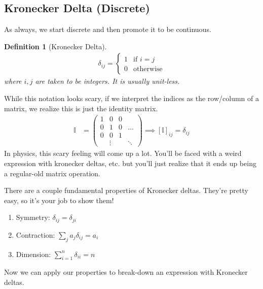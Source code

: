 \documentclass[12pt,fleqn]{article}
\numberwithin{equation}{section} %
\newtheorem{definition}{Definition}
\newcounter{problem}
\begin{document}
\subsection{Kronecker Delta (Discrete)}
As always, we start discrete and then promote it to be continuous.
\begin{definition}
	[Kronecker Delta]
	\begin{align}
		\delta_{ij} = \begin{cases}
			1 & \text{if } i = j\\
			0 & \text{otherwise}
		\end{cases}
	\end{align}
	where $i,j$ are taken to be integers. It is usually unit-less.
\end{definition}
While this notation looks scary, if we interpret the indices as the row/column of a matrix, we realize this is just the identity matrix.
\begin{align}
	\mathbb I & = \begin{pmatrix}
		1 & 0 & 0 & \\
		0 & 1 & 0 & ...\\
		0 & 0 & 1 & \\
	  	  & \vdots & & \ddots
	\end{pmatrix} \implies [\mathbb I]_{ij}  = \delta_{ij}
\end{align}
In physics, this scary feeling will come up a lot. You'll be faced with a weird expression with kronecker deltas, etc. but you'll just realize that it ends up being a regular-old matrix operation. 
\begin{problem} There are a couple fundamental properties of Kronecker deltas. They're pretty easy, so it's your job to show them!
	\begin{enumerate}
		\item Symmetry: $\delta_{ij} = \delta_{ji}$
		\item Contraction: $\sum_j a_j \delta_{ij} = a_i$
		\item Dimension: $\sum_{i=1}^n \delta_{ii} = n$
	\end{enumerate}
\end{problem}
Now we can apply our properties to break-down an expression with Kronecker deltas.
\end{document}
